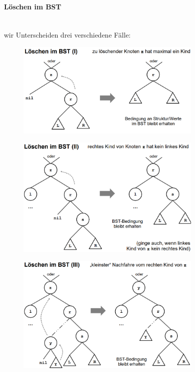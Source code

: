 \documentclass[
    ngerman,
    color=3b,
    load_common, %
    summary,
    boxarc,
]{tuda_summary}
\begin{document}
\paragraph{Löschen im BST}\mbox{}\\
wir Unterscheiden drei verschiedene Fälle:
\begin{figure}[h]
    \includegraphics[width=9cm]{pictures/binärerSuchbaumLöschen1.PNG}
\end{figure}
\begin{figure}[h]
    \includegraphics[width=9cm]{pictures/binärerSuchbaumLöschen2.PNG}
\end{figure}
\begin{figure}[h]
    \includegraphics[width=9cm]{pictures/binärerSuchbaumLöschen3.PNG}
\end{figure}
\end{document}
